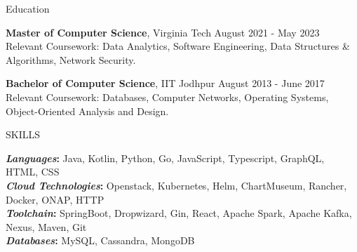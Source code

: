\documentclass{resume} %
\begin{document}

\begin{rSection}{Education}

{\bf Master of Computer Science}, Virginia Tech \hfill {August 2021 - May 2023}\\
Relevant Coursework: Data Analytics, Software Engineering, Data Structures \& Algorithms, Network Security.

{\bf Bachelor of Computer Science}, IIT Jodhpur \hfill {August 2013 - June 2017}\\
Relevant Coursework: Databases, Computer Networks, Operating Systems, Object-Oriented Analysis and Design.


\end{rSection}

\begin{rSection}{SKILLS}


\textbf{\textit{Languages}:} Java, Kotlin, Python, Go, JavaScript, Typescript, GraphQL, HTML, CSS
\\
\textbf{\textit{Cloud Technologies}:} Openstack, Kubernetes, Helm, ChartMuseum, Rancher, Docker, ONAP, HTTP\\
\textbf{\textit{Toolchain}:} SpringBoot, Dropwizard, Gin, React, Apache Spark, Apache Kafka, Nexus, Maven, Git\\
\textbf{\textit{Databases}:} MySQL, Cassandra, MongoDB
\end{rSection}
\end{document}
